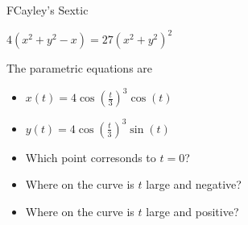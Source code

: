 \documentclass{ximera}
\begin{document}
\begin{example} FCayley's Sextic

$4(x^2 + y^2 - x) = 27 (x^2 + y^2)^2$

The parametric equations are

\begin{itemize}
\item $x(t) = 4 \cos \left( \frac{t}{3} \right)^3 \cos(t)$
\item $y(t) = 4 \cos \left( \frac{t}{3} \right)^3 \sin(t)$
\end{itemize}






\begin{center}
\end{center}




\begin{itemize}
\item Which point corresonds to $t=0$? 
\item Where on the curve is $t$ large and negative?
\item Where on the curve is $t$ large and positive?
\end{itemize}






\end{example}
\end{document}
